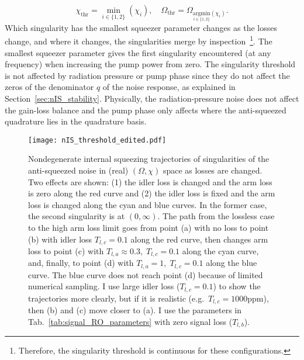\begin{equation}
\chi_\text{thr}=\min_{i\in\{1,2\}}(\chi_i),\quad\Omega_\text{thr}=\Omega_{\underset{i\in\{1,2\}}{\text{argmin}}(\chi_i)}.
\end{equation}
Which singularity has the smallest squeezer parameter changes as the losses change, and where it changes, the singularities merge by inspection~\footnote{Therefore, the singularity threshold is continuous for these configurations.}. The smallest squeezer parameter gives the first singularity encountered (at any frequency) when increasing the pump power from zero. %
The singularity threshold is not affected by radiation pressure or pump phase since they do not affect the zeros of the denominator $q$ of the noise response, as explained in Section~\ref{sec:nIS_stability}. Physically, the radiation-pressure noise does not affect the gain-loss balance and the pump phase only affects where the anti-squeezed quadrature lies in the quadrature basis.

\begin{figure}[ht]
    \centering
    \texttt{[image: nIS\_threshold\_edited.pdf]}
    \caption{Nondegenerate internal squeezing trajectories of singularities of the anti-squeezed noise in (real) $(\Omega, \chi)$ space as losses are changed. Two effects are shown: (1) the idler loss is changed and the arm loss is zero along the red curve and (2) the idler loss is fixed and the arm loss is changed along the cyan and blue curves. In the former case, the second singularity is at $(0,\infty)$.
    The path from the lossless case to the high arm loss limit goes from point (a) with no loss to point (b) with idler loss $T_{l,c}=0.1$ along the red curve, then changes arm loss to point (c) with $T_{l,a}\approx0.3,\;T_{l,c}=0.1$ along the cyan curve, and, finally, to point (d) with $T_{l,a}=1,\;T_{l,c}=0.1$ along the blue curve. The blue curve does not reach point (d) because of limited numerical sampling.
    I use large idler loss ($T_{l,c}=0.1$) to show the trajectories more clearly, but if it is realistic (e.g.\ $T_{l,c}=1000\text{ppm}$), then (b) and (c) move closer to (a). I use the parameters in Tab.~\ref{tab:signal_RO_parameters} with zero signal loss ($T_{l,b}$).}
    \label{fig:nIS_threshold_traj}
\end{figure}

